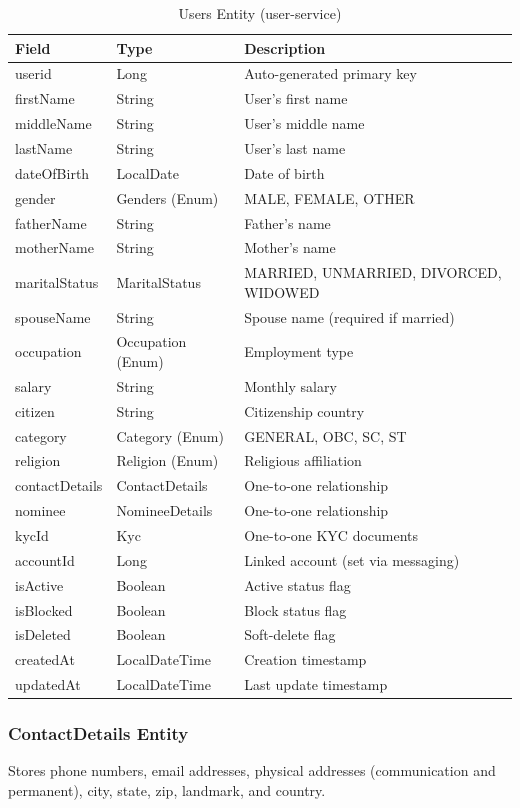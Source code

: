 \documentclass[12pt,a4paper]{report}
\begin{document}
\begin{table}[H]
\centering
\caption{Users Entity (user-service)}
\begin{tabularx}{\textwidth}{llX}
\toprule
\textbf{Field} & \textbf{Type} & \textbf{Description} \\
\midrule
userid & Long & Auto-generated primary key \\
firstName & String & User's first name \\
middleName & String & User's middle name \\
lastName & String & User's last name \\
dateOfBirth & LocalDate & Date of birth \\
gender & Genders (Enum) & MALE, FEMALE, OTHER \\
fatherName & String & Father's name \\
motherName & String & Mother's name \\
maritalStatus & MaritalStatus & MARRIED, UNMARRIED, DIVORCED, WIDOWED \\
spouseName & String & Spouse name (required if married) \\
occupation & Occupation (Enum) & Employment type \\
salary & String & Monthly salary \\
citizen & String & Citizenship country \\
category & Category (Enum) & GENERAL, OBC, SC, ST \\
religion & Religion (Enum) & Religious affiliation \\
contactDetails & ContactDetails & One-to-one relationship \\
nominee & NomineeDetails & One-to-one relationship \\
kycId & Kyc & One-to-one KYC documents \\
accountId & Long & Linked account (set via messaging) \\
isActive & Boolean & Active status flag \\
isBlocked & Boolean & Block status flag \\
isDeleted & Boolean & Soft-delete flag \\
createdAt & LocalDateTime & Creation timestamp \\
updatedAt & LocalDateTime & Last update timestamp \\
\bottomrule
\end{tabularx}
\end{table}

\subsubsection{ContactDetails Entity}
Stores phone numbers, email addresses, physical addresses (communication and permanent), city, state, zip, landmark, and country.
\end{document}
